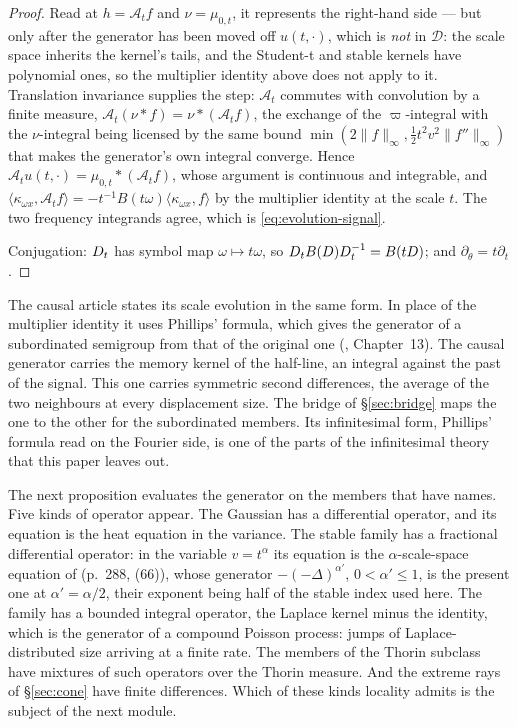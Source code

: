 \begin{proof}
Read at $h = \mathcal{A}_tf$ and $\nu = \mu_{0,t}$, it represents the right-hand side --- but
only after the generator has been moved off $u(t,\cdot)$, which is \emph{not} in $\mathcal{D}$:
the scale space inherits the kernel's tails, and the Student-t and stable kernels have
polynomial ones, so the multiplier identity above does not
apply to it. Translation invariance supplies the step: $\mathcal{A}_t$ commutes with convolution
by a finite measure, $\mathcal{A}_t(\nu * f) = \nu * (\mathcal{A}_tf)$, the exchange of the
$\varpi$-integral with the $\nu$-integral being licensed by the same bound
$\min(2\|f\|_\infty, \tfrac12t^2v^2\|f''\|_\infty)$ that makes the generator's own integral
converge. Hence $\mathcal{A}_tu(t,\cdot) = \mu_{0,t} * (\mathcal{A}_tf)$, whose argument is
continuous and integrable, and
$\langle\kappa_{\omega x},\mathcal{A}_tf\rangle = -t^{-1}B(t\omega)\langle\kappa_{\omega x},f\rangle$
by the multiplier identity at the scale $t$. The two frequency integrands agree, which is
\ref{eq:evolution-signal}.

Conjugation: $D_{t}$ has symbol map $\omega \mapsto t\omega$, so
$D_{t}B(D)D_{t}^{-1} = B(tD)$; and $\partial_\theta = t\partial_t$.
\end{proof}

\begin{remark}\label{rem:causal-relation-generator}
The causal article  states its scale evolution in the same
form. In place of the multiplier identity it uses Phillips' formula, which gives the generator
of a subordinated semigroup from that of the original one (,
Chapter~13). The causal generator carries the memory kernel of the half-line, an integral
against the past of the signal. This one carries symmetric second differences, the average of
the two neighbours at every displacement size. The bridge of \S\ref{sec:bridge} maps the one
to the other for the subordinated members. Its infinitesimal form, Phillips' formula read on
the Fourier side, is one of the parts of the infinitesimal theory that this paper leaves out.
\end{remark}

The next proposition evaluates the generator on the members that have names. Five kinds of
operator appear. The Gaussian has a differential operator, and its equation is the heat
equation in the variance. The stable family has a fractional differential operator: in the
variable $v = t^\alpha$ its equation is the $\alpha$-scale-space equation of
 (p.~288, (66)), whose generator $-(-\Delta)^{\alpha'}$,
$0 < \alpha' \le 1$, is the present one at $\alpha' = \alpha/2$, their exponent being half of
the stable index used here. The \Matern{} family has a bounded integral operator, the Laplace
kernel minus the identity, which is the generator of a compound Poisson process: jumps of
Laplace-distributed size arriving at a finite rate. The members of the Thorin subclass have
mixtures of such operators over the Thorin measure. And the extreme rays of \S\ref{sec:cone}
have finite differences. Which of these kinds locality admits is the subject of the next
module.

